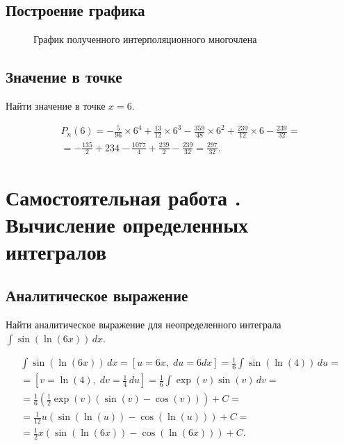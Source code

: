 \documentclass[10pt, a4paper, titlepage]{article}
\begin{document}
\subsection*{Построение графика}
\begin{figure}[H]
    \centering
    \caption{График полученного интерполяционного многочлена}
\end{figure}

\subsection*{Значение в точке}

Найти значение в точке $x=6$.

\begin{multline*}
P_n(6) =
-\frac{5}{96}\times6^4+\frac{13}{12}\times6^3-\frac{359}{48}\times6^2+\frac{239}{12}\times6-\frac{239}{32}= \\ =
-\frac{135}{2}+234-\frac{1077}{4}+\frac{239}{2}-\frac{239}{32}=\frac{297}{32}.
\end{multline*}

\newpage
\section{Самостоятельная работа . Вычисление определенных интегралов}

\subsection*{Аналитическое выражение}

Найти аналитическое выражение для неопределенного интеграла $\int \sin(\ln(6x))\,dx$.

\begin{multline*}
\int\sin(\ln(6x))\,dx =
\left[u=6x,\;du=6dx\right] =
\frac{1}{6}\int\sin(\ln(4))\,du = \\ =
\left[v=\ln(4),\;dv=\frac{1}{4}\,du\right] =
\frac{1}{6}\int\exp(v)\sin(v)\,dv = \\ =
\frac{1}{6}\left(\frac{1}{2}\exp(v)(\sin(v)-\cos(v))\right)+C = \\ =
\frac{1}{12}u(\sin(\ln(u))-\cos(\ln(u)))+C = \\ =
\frac{1}{2}x(\sin(\ln(6x))-\cos(\ln(6x)))+C.
\end{multline*}
\end{document}
